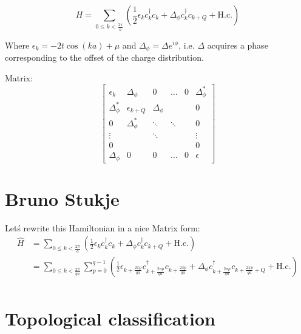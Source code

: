 \documentclass[letterpaper, 10 pt, conference]{ieeeconf}  %
\begin{document}
$$ H = \sum_{0 \leq k < \frac{2\pi}{a}} (\frac{1}{2}\epsilon_k c_k^{\dagger}c_k + \Delta_\phi c_k^{\dagger}c_{k+Q} + \text{H.c.}) $$

Where $\epsilon_k = -2t \cos(ka) + \mu $ and $\Delta_\phi = \Delta e^{i\phi}$, i.e. $\Delta$ acquires a phase corresponding to the offset of the charge distribution.

Matrix:
$$
\begin{bmatrix}
\epsilon_k       & \Delta_\phi     & 0      & \hdots       & 0     & \Delta_\phi^*  \\
\Delta_\phi^*    & \epsilon_{k+Q} & \Delta_\phi &  &        & 0 \\
0               & \Delta_\phi^* & \ddots & \ddots  & & 0   \\
\vdots   &  & \ddots &  &  &   \vdots \\
0 &        &  &  &  & 0 \\
\Delta_\phi & 0 & 0     & \hdots             & 0      & \epsilon
\end{bmatrix}
$$

\section{Bruno Stukje}
Let\'s rewrite this Hamiltonian in a nice Matrix form:
\begin{align*}
\hat{H} &= \sum_{0 \leq k < \frac{2\pi}{a}} (\frac{1}{2}\epsilon_k c_k^{\dagger}c_k + \Delta_\phi c_k^{\dagger}c_{k+Q} + \text{H.c.})\\
&=\sum_{0 \leq k < \frac{2\pi}{qa}} \sum_{p=0}^{q-1}  (\frac{1}{2}\epsilon_{k+\frac{2\pi p}{qa}} c_{k+\frac{2\pi p}{qa}}^{\dagger}c_{k+\frac{2\pi p}{qa}} + \Delta_\phi c_{k+\frac{2\pi p}{qa}}^{\dagger}c_{k+\frac{2\pi p}{qa}+Q} + \text{H.c.})\\
\end{align*}

\section{Topological classification}
\end{document}
